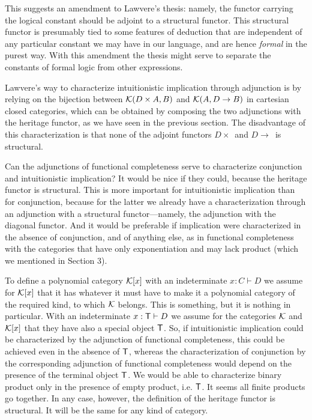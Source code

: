 \documentclass[12pt]{article}
\begin{document}
This suggests an amendment to Lawvere's thesis: namely, the functor carrying
the logical constant should be adjoint to a structural functor. This
structural functor is presumably tied to some features of deduction that are
independent of any particular constant we may have in our language, and are
hence {\it formal} in the purest way. With this amendment the thesis might
serve to separate the constants of formal logic from other expressions.

Lawvere's way to characterize intuitionistic implication through adjunction
is by relying on the bijection between ${\cal K}(D\times A,B)$ and ${\cal K}%
(A,D\rightarrow B)$ in cartesian closed categories, which can be obtained by
composing the two adjunctions with the heritage functor, as we have seen in
the previous section. The disadvantage of this characterization is that none
of the adjoint functors $D\times $\ and $D\rightarrow $\ is structural.

Can the adjunctions of functional completeness serve to characterize
conjunction and intuitionistic implication? It would be nice if they could,
because the heritage functor is structural. This is more important for
intuitionistic implication than for conjunction, because for the latter we
already have a characterization through an adjunction with a structural
functor---namely, the adjunction with the diagonal functor. And it would be
preferable if implication were characterized in the absence of conjunction,
and of anything else, as in functional completeness with the categories that
have only exponentiation and may lack product (which we mentioned in Section
3).

To define a polynomial category ${\cal K}[x]$ with an indeterminate $%
x:C\vdash D$ we assume for ${\cal K}[x]$ that it has whatever it must have
to make it a polynomial category of the required kind, to which ${\cal K}$
belongs. This is something, but it is nothing in particular. With an
indeterminate $x:{\sf T}\vdash D$ we assume for the categories ${\cal K}$
and ${\cal K}[x]$ that they have also a special object ${\sf T}$. So, if
intuitionistic implication could be characterized by the adjunction of
functional completeness, this could be achieved even in the absence of ${\sf %
T}$, whereas the characterization of conjunction by the corresponding
adjunction of functional completeness would depend on the presence of the
terminal object ${\sf T}$. We would be able to characterize binary product
only in the presence of empty product, i.e. ${\sf T}$. It seems all finite
products go together. In any case, however, the definition of the heritage
functor is structural. It will be the same for any kind of category.
\end{document}
